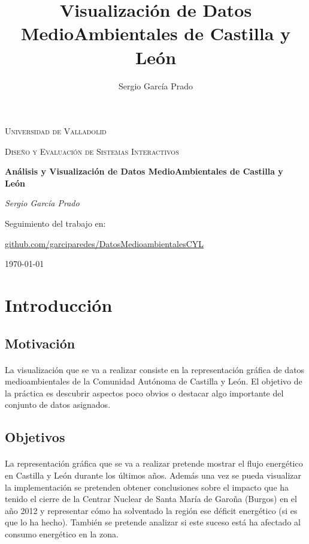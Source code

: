 \documentclass{article}
\title{Visualización de Datos MedioAmbientales de Castilla y León}
\author{Sergio García Prado}
\begin{document}
	\begin{titlepage}
		\centering
		{\scshape\LARGE Universidad de Valladolid \par}
		\vspace{1cm}
		{\scshape\Large Diseño y Evaluación de Sistemas Interactivos\par}
		\vspace{1.5cm}
		{\huge\bfseries Análisis y Visualización de Datos MedioAmbientales de Castilla y León\par}
		\vspace{2cm}
		{\Large\itshape Sergio García Prado\par}

		\vfill
		Seguimiento del trabajo en: \par
		\href{https://github.com/garciparedes/DatosMedioambientalesCYL}{github.com/garciparedes/DatosMedioambientalesCYL}
		\vfill


		{\large \today\par}
	\end{titlepage}



	\newpage
		\tableofcontents
	\newpage


	\section{Introducción}

		\subsection{Motivación}

			\paragraph{}
			La visualización que se va a realizar consiste en la representación gráfica de datos medioambientales de la Comunidad Autónoma de Castilla y León. El objetivo de la práctica es descubrir aspectos poco obvios o destacar algo importante del conjunto de datos asignados.

		\subsection{Objetivos}

			\paragraph{}
			La representación gráfica que se va a realizar pretende mostrar el flujo energético en Castilla y León durante los últimos años. 
			Además una vez se pueda visualizar la implementación se pretenden obtener conclusiones sobre el impacto que ha tenido el cierre de la Centrar Nuclear de Santa María de Garoña (Burgos) en el año 2012 y representar cómo ha solventado la región ese déficit energético (si es que lo ha hecho). También se pretende analizar si este suceso está ha afectado al consumo energético en la zona.
\end{document}
